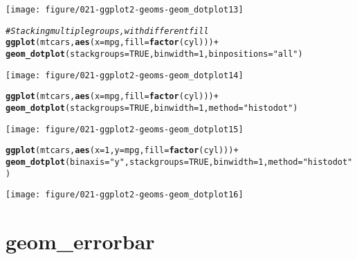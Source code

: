 \documentclass[a4paper,titlepage]{tufte-handout}\usepackage[]{graphicx}\usepackage[]{color}
\makeatletter
\def\maxwidth{ %
  \ifdim\Gin@nat@width>\linewidth
    \linewidth
  \else
    \Gin@nat@width
  \fi
}
\newcommand{\hlnum}[1]{\textcolor[rgb]{0.686,0.059,0.569}{#1}}%
\newcommand{\hlstr}[1]{\textcolor[rgb]{0.192,0.494,0.8}{#1}}%
\newcommand{\hlcom}[1]{\textcolor[rgb]{0.678,0.584,0.686}{\textit{#1}}}%
\newcommand{\hlopt}[1]{\textcolor[rgb]{0,0,0}{#1}}%
\newcommand{\hlstd}[1]{\textcolor[rgb]{0.345,0.345,0.345}{#1}}%
\newcommand{\hlkwc}[1]{\textcolor[rgb]{0.333,0.667,0.333}{#1}}%
\newcommand{\hlkwd}[1]{\textcolor[rgb]{0.737,0.353,0.396}{\textbf{#1}}}%
\newenvironment{kframe}{%
 \def\at@end@of@kframe{}%
 \ifinner\ifhmode%
  \def\at@end@of@kframe{\end{minipage}}%
  \begin{minipage}{\columnwidth}%
 \fi\fi%
 \def\FrameCommand##1{\hskip\@totalleftmargin \hskip-\fboxsep
 \colorbox{shadecolor}{##1}\hskip-\fboxsep
     \hskip-\linewidth \hskip-\@totalleftmargin \hskip\columnwidth}%
 \MakeFramed {\advance\hsize-\width
   \@totalleftmargin\z@ \linewidth\hsize
   \@setminipage}}%
 {\par\unskip\endMakeFramed%
 \at@end@of@kframe}
\newenvironment{knitrout}{}{} %
\makeatother
\begin{document}
\begin{knitrout}
\begin{kframe}
{\ttfamily\noindent\itshape\color{messagecolor}{\#\# stat\_bindot: binwidth defaulted to range/30. Use 'binwidth = x' to adjust this.}}\end{kframe}
\texttt{[image: figure/021-ggplot2-geoms-geom\_dotplot13]} 
\begin{kframe}\begin{alltt}
\hlcom{# Stacking multiple groups, with different fill}
\hlkwd{ggplot}\hlstd{(mtcars,} \hlkwd{aes}\hlstd{(}\hlkwc{x} \hlstd{= mpg,} \hlkwc{fill} \hlstd{=} \hlkwd{factor}\hlstd{(cyl)))} \hlopt{+}
  \hlkwd{geom_dotplot}\hlstd{(}\hlkwc{stackgroups} \hlstd{=} \hlnum{TRUE}\hlstd{,} \hlkwc{binwidth} \hlstd{=} \hlnum{1}\hlstd{,} \hlkwc{binpositions} \hlstd{=} \hlstr{"all"}\hlstd{)}
\end{alltt}
\end{kframe}
\texttt{[image: figure/021-ggplot2-geoms-geom\_dotplot14]} 
\begin{kframe}\begin{alltt}
\hlkwd{ggplot}\hlstd{(mtcars,} \hlkwd{aes}\hlstd{(}\hlkwc{x} \hlstd{= mpg,} \hlkwc{fill} \hlstd{=} \hlkwd{factor}\hlstd{(cyl)))} \hlopt{+}
  \hlkwd{geom_dotplot}\hlstd{(}\hlkwc{stackgroups} \hlstd{=} \hlnum{TRUE}\hlstd{,} \hlkwc{binwidth} \hlstd{=} \hlnum{1}\hlstd{,} \hlkwc{method} \hlstd{=} \hlstr{"histodot"}\hlstd{)}
\end{alltt}
\end{kframe}
\texttt{[image: figure/021-ggplot2-geoms-geom\_dotplot15]} 
\begin{kframe}\begin{alltt}
\hlkwd{ggplot}\hlstd{(mtcars,} \hlkwd{aes}\hlstd{(}\hlkwc{x} \hlstd{=} \hlnum{1}\hlstd{,} \hlkwc{y} \hlstd{= mpg,} \hlkwc{fill} \hlstd{=} \hlkwd{factor}\hlstd{(cyl)))} \hlopt{+}
  \hlkwd{geom_dotplot}\hlstd{(}\hlkwc{binaxis} \hlstd{=} \hlstr{"y"}\hlstd{,} \hlkwc{stackgroups} \hlstd{=} \hlnum{TRUE}\hlstd{,} \hlkwc{binwidth} \hlstd{=} \hlnum{1}\hlstd{,} \hlkwc{method} \hlstd{=} \hlstr{"histodot"}\hlstd{)}
\end{alltt}
\end{kframe}
\texttt{[image: figure/021-ggplot2-geoms-geom\_dotplot16]} 

\end{knitrout}



\section{geom\_errorbar}
\end{document}
